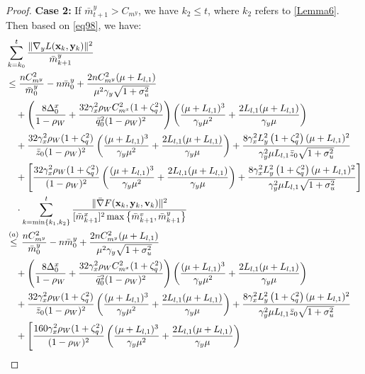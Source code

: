\documentclass{article}
\theoremstyle{plain}
\theoremstyle{definition}
\theoremstyle{remark}
\begin{document}
\begin{proof}
\textbf{Case 2:} If $\bar{m}^y_{t+1}> C_{m^y}$, we have $k_2 \leq t$, where $k_2$ refers to \cref{Lemma6}. Then based on \cref{eq98}, we have:
\begin{align}
&\sum_{k=k_0}^t \frac{\|\nabla_y L(\mathbf{x}_k, \mathbf{y}_k)\|^2}{\bar{m}^y_{k+1}}\nonumber\\
&\leq\frac{nC_{m^y}^2}{\bar{m}^y_0} - n\bar{m}^y_0 + \frac{ 2nC_{m^y}^2(\mu + L_{l,1})}{\mu^2\gamma_y\sqrt{1+\sigma_u^2}}\notag\\
&\quad+\left(\frac{8\Delta_0^x}{1-\rho_W}+\frac{32 \gamma_x^2 \rho_WC_{m^x}^2 (1 + \zeta_q^2)}{\bar{q}_0^2(1 - \rho_W)^2} \right)\left(\frac{(\mu+L_{l,1})^3}{\gamma_y\mu^2}+\frac{2L_{l,1}(\mu+L_{l,1})}{\gamma_y\mu}\right)\nonumber\\
&\quad+ \frac{32 \gamma_x^2 \rho_W(1 + \zeta_q^2)}{\bar{z}_0(1 - \rho_W)^2} \left(\frac{(\mu+L_{l,1})^3}{\gamma_y\mu^2}+\frac{2L_{l,1}(\mu+L_{l,1})}{\gamma_y\mu}\right)+\frac{8\gamma_x^2  L_y^2\left( 1 + \zeta_q^2 \right) (\mu + L_{l,1})^2}{\gamma_y^2\mu L_{l,1}\bar{z}_0\sqrt{1+\sigma_u^2}} \nonumber\\
&\quad+ \left[\frac{32 \gamma_x^2 \rho_W(1 + \zeta_q^2)}{(1 - \rho_W)^2} \left(\frac{(\mu+L_{l,1})^3}{\gamma_y\mu^2}+\frac{2L_{l,1}(\mu+L_{l,1})}{\gamma_y\mu}\right)+\frac{8\gamma_x^2  L_y^2\left( 1 + \zeta_q^2 \right) (\mu + L_{l,1})^2}{\gamma_y^2\mu L_{l,1}\sqrt{1+\sigma_u^2}}\right]\nonumber\\
&\quad\cdot\sum_{k=\min\{k_1,k_2\}}^t \frac{\|\bar{\nabla} F(\mathbf{x}_k,\mathbf{y}_k,\mathbf{v}_k)\|^2}{[\bar{m}^x_{k+1}]^2\max \big\{\bar{m}^v_{k+1}, \bar{m}^y_{k+1}\big\}}\nonumber\\
&\overset{(a)}{\leq}\frac{nC_{m^y}^2}{\bar{m}^y_0} - n\bar{m}^y_0 + \frac{ 2nC_{m^y}^2(\mu + L_{l,1})}{\mu^2\gamma_y\sqrt{1+\sigma_u^2}} \notag\\
&\quad+\left(\frac{8\Delta_0^x}{1-\rho_W}+\frac{32 \gamma_x^2 \rho_WC_{m^x}^2 (1 + \zeta_q^2)}{\bar{q}_0^2(1 - \rho_W)^2} \right)\left(\frac{(\mu+L_{l,1})^3}{\gamma_y\mu^2}+\frac{2L_{l,1}(\mu+L_{l,1})}{\gamma_y\mu}\right)\nonumber\\
&\quad+ \frac{32 \gamma_x^2 \rho_W(1 + \zeta_q^2)}{\bar{z}_0(1 - \rho_W)^2} \left(\frac{(\mu+L_{l,1})^3}{\gamma_y\mu^2}+\frac{2L_{l,1}(\mu+L_{l,1})}{\gamma_y\mu}\right)+\frac{8\gamma_x^2  L_y^2\left( 1 + \zeta_q^2 \right) (\mu + L_{l,1})^2}{\gamma_y^2\mu L_{l,1}\bar{z}_0\sqrt{1+\sigma_u^2}} \nonumber\\
&\quad+\left[\frac{160 \gamma_x^2 \rho_W(1 + \zeta_q^2)}{(1 - \rho_W)^2} \left(\frac{(\mu+L_{l,1})^3}{\gamma_y\mu^2}+\frac{2L_{l,1}(\mu+L_{l,1})}{\gamma_y\mu}\right)\right.\nonumber\\

\end{align}
\end{proof}
\end{document}
